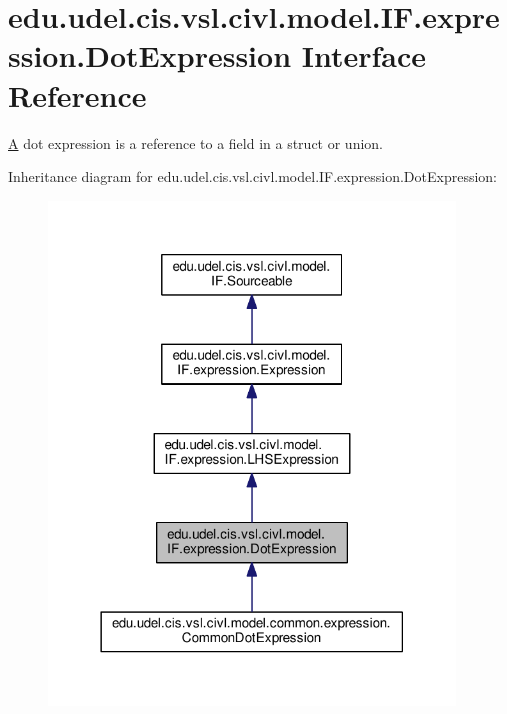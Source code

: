 \hypertarget{interfaceedu_1_1udel_1_1cis_1_1vsl_1_1civl_1_1model_1_1IF_1_1expression_1_1DotExpression}{}\section{edu.\+udel.\+cis.\+vsl.\+civl.\+model.\+I\+F.\+expression.\+Dot\+Expression Interface Reference}
\label{interfaceedu_1_1udel_1_1cis_1_1vsl_1_1civl_1_1model_1_1IF_1_1expression_1_1DotExpression}


\hyperlink{structA}{A} dot expression is a reference to a field in a struct or union.  




Inheritance diagram for edu.\+udel.\+cis.\+vsl.\+civl.\+model.\+I\+F.\+expression.\+Dot\+Expression\+:
\nopagebreak
\begin{figure}[H]
\begin{center}
\leavevmode
\includegraphics[width=306pt]{interfaceedu_1_1udel_1_1cis_1_1vsl_1_1civl_1_1model_1_1IF_1_1expression_1_1DotExpression__inherit__graph}
\end{center}
\end{figure}



